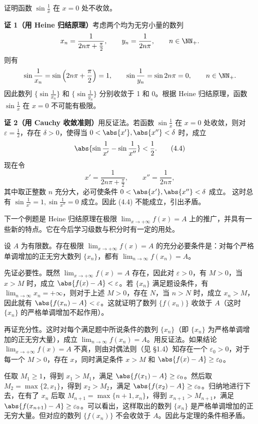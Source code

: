 \begin{xexample}[4.2.3]
证明函数 $\sin\frac1x$ 在 $x=0$ 处不收敛。
\end{xexample}
\begin{xproof}
\textbf{证 1（用 Heine 归结原理）}\quad 考虑两个均为无穷小量的数列
\[
  x_n=\frac1{2n\pi+\frac\pi2},\qquad y_n=\frac1{2n\pi},\qquad n\in\NN_+.
\]
则有
\[
  \sin\frac1{x_n}=\sin\left(2n\pi+\frac\pi2\right)=1,\qquad
  \sin\frac1{y_n}=\sin2n\pi=0,\qquad n\in\NN_+.
\]
因此数列 $\{\sin\frac1{x_n}\}$ 和 $\{\sin\frac1{y_n}\}$ 分别收敛于 1 和 0。根据 Heine 归结原理，函数 $\sin\frac1x$ 在 $x=0$ 不可能有极限。

\textbf{证 2（用 Cauchy 收敛准则）}\quad 用反证法。若函数 $\sin\frac1x$ 在 $x=0$ 处收敛，则对 $\varepsilon=\frac12$，存在 $\delta>0$，使得当 $0<\abs{x'},\abs{x''}<\delta$ 时，成立
\begin{equation}
  \abs{\sin\frac1{x'}-\sin\frac1{x''}}<\frac12.
  \tag{4.4}
  \label{eq:4.4}
\end{equation}
现在令
\[
  x'=\frac1{2n\pi+\frac\pi2},\qquad x''=\frac1{2n\pi},
\]
其中取正整数 $n$ 充分大，必可使条件 $0<\abs{x'},\abs{x''}<\delta$ 成立。%
这时总有 $\sin\frac1{x'}=1,\sin\frac1{x''}=0$ 成立。因此 (4.4) 不能成立，引出矛盾。
\end{xproof}

下一个例题是 Heine 归结原理在极限 $\lim_{x\to+\infty}f(x)=A$ 上的推广，并具有一些新的特点。它在今后学习级数与积分时有一定的用处。

\begin{xexample}[4.2.4]
设 $A$ 为有限数。存在极限 $\lim_{x\to+\infty}f(x)=A$ 的充分必要条件是：对每个严格单调增加的正无穷大数列 $\{x_n\}$，都有 $\lim_{n\to\infty}f(x_n)=A$。
\end{xexample}
\begin{xproof}
先证必要性。既然 $\lim_{x\to+\infty}f(x)=A$ 存在，因此对 $\varepsilon>0$，有 $M>0$，当 $x>M$ 时，成立 $\abs{f(x)-A}<\varepsilon$。若 $\{x_n\}$ 满足题设条件，有 $\lim_{n\to\infty}x_n=+\infty$，则对于上述 $M>0$，存在 $N$，当 $n>N$ 时，成立 $x_n>M$，因此就有 $\abs{f(x_n)-A}<\varepsilon$。这就证明了数列 $\{f(x_n)\}$ 收敛于 $A$（这时 $\{x_n\}$ 的严格单调增加不起作用）。

再证充分性。这时对每个满足题中所说条件的数列 $\{x_n\}$（即 $\{x_n\}$ 为严格单调增加的正无穷大量），成立 $\lim_{n\to\infty}f(x_n)=A$。用反证法。如果结论 $\lim_{x\to+\infty}f(x)=A$ 不真，则由对偶法则（见 §1.4）知存在一个 $\varepsilon_0>0$，对于每一个 $M>0$，存在 $x$，同时满足条件 $x>M$ 和 $\abs{f(x)-A}\geq\varepsilon_0$。

任取 $M_1\geq1$，得到 $x_1>M_1$，满足 $\abs{f(x_1)-A}\geq\varepsilon_0$。然后取 $M_2=\max\{2,x_1\}$，得到 $x_2>M_2$，满足 $\abs{f(x_2)-A}\geq\varepsilon_0$。归纳地进行下去，在有了 $x_n$ 后取 $M_{n+1}=\max\{n+1,x_n\}$，得到 $x_{n+1}>M_{n+1}$，满足 $\abs{f(x_{n+1})-A}\geq\varepsilon_0$。可以看出，这样取出的数列 $\{x_n\}$ 是严格单调增加的正无穷大量。但对应的数列 $\{f(x_n)\}$ 不会收敛于 $A$。因此与定理的条件相矛盾。
\end{xproof}

